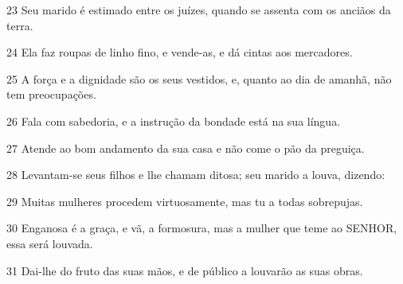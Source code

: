 \par 23 Seu marido é estimado entre os juízes, quando se assenta com os anciãos da terra.
\par 24 Ela faz roupas de linho fino, e vende-as, e dá cintas aos mercadores.
\par 25 A força e a dignidade são os seus vestidos, e, quanto ao dia de amanhã, não tem preocupações.
\par 26 Fala com sabedoria, e a instrução da bondade está na sua língua.
\par 27 Atende ao bom andamento da sua casa e não come o pão da preguiça.
\par 28 Levantam-se seus filhos e lhe chamam ditosa; seu marido a louva, dizendo:
\par 29 Muitas mulheres procedem virtuosamente, mas tu a todas sobrepujas.
\par 30 Enganosa é a graça, e vã, a formosura, mas a mulher que teme ao SENHOR, essa será louvada.
\par 31 Dai-lhe do fruto das suas mãos, e de público a louvarão as suas obras.


